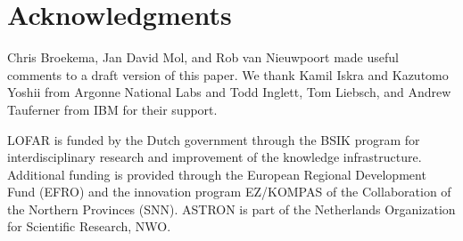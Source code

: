 \documentclass[journal]{IEEEtran}
\begin{document}



\section*{Acknowledgments}

Chris Broekema, Jan David Mol, and Rob van Nieuwpoort made useful comments to
a draft version of this paper.
We thank Kamil Iskra and Kazutomo Yoshii from Argonne National Labs and 
Todd Inglett, Tom Liebsch, and Andrew Tauferner from IBM for their support.

LOFAR is funded by the Dutch government through the
BSIK program for interdisciplinary research and
improvement of the knowledge infrastructure. Additional
funding is provided through the European Regional
Development Fund (EFRO) and the innovation program
EZ/KOMPAS of the Collaboration of the Northern
Provinces (SNN). ASTRON is part of the Netherlands
Organization for Scientific Research, NWO.





\end{document}
